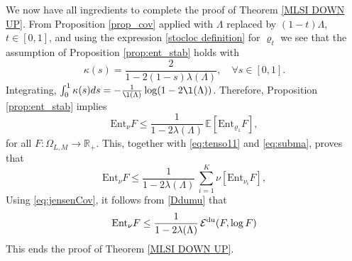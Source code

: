 \documentclass[11pt,reqno]{amsart}
\numberwithin{equation}{section}
\numberwithin{figure}{section}
\renewcommand{\leq}{\le}%
\newcommand{\cov}{{\rm Cov}}
\newcommand{\1}{\mathds{1}}
\let\L=\Lambda
\newcommand{\cE}{\ensuremath{\mathcal E}}
\begin{document}
\medskip

We now have all ingredients to complete the proof of Theorem \ref{MLSI DOWN UP}. From Proposition \ref{prop_cov} applied with $\L$ replaced by $(1-t)\L$, $t\in[0,1]$, and using the expression \eqref{stocloc definition} for $\varrho_t$ we see that the assumption of  Proposition \ref{prop:ent_stab} holds with 
\[
\kappa(s) = \frac{2}{1 - 2(1 - s)\lambda(\Lambda)}, \quad \forall s \in [0,1].
\]
Integrating, $\int_0^1\kappa(s)ds = -\frac1{\l(\L)}\log(1-2\l(\L))$. Therefore, Proposition \ref{prop:ent_stab} implies 
\begin{equation}
    \mathrm{Ent}_{\nu}F \leq \frac{1}{1 - 2\lambda(\Lambda)} \, \mathbb{E} \left[ \mathrm{Ent}_{\varrho_1}F \right],
\end{equation}
for all $F : \Omega_{L,M} \to \mathbb{R}_+$.
This, together with \eqref{eq:tenso11} and \eqref{eq:subma}, proves that 
\begin{equation}
    \mathrm{Ent}_{\nu}F \leq \frac{1}{1 - 2\lambda(\Lambda)} \, \sum_{i=1}^K \nu\left[ \mathrm{Ent}_{\nu_i}F \right],
\end{equation}
Using \eqref{eq:jensenCov},
it follows from \eqref{Ddumu}
that 
\begin{equation}
    \mathrm{Ent}_{\nu}F \leq \frac{1}{1 - 2\lambda(\Lambda)} \,
    \cE^{\rm du} (F,\log F) 
\end{equation}
This ends the proof of Theorem \ref{MLSI DOWN UP}.
\end{document}
